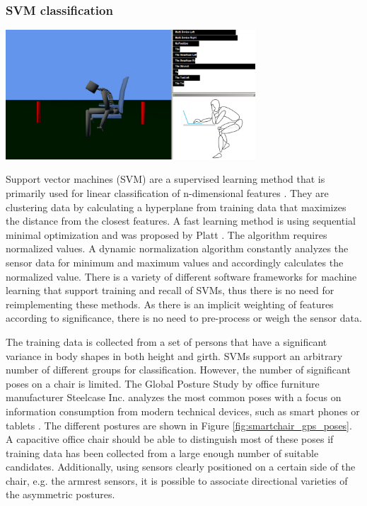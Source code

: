 \subsubsection*{SVM classification}
\begin{minipage}{\linewidth}
\centering
\includegraphics[width=0.7\textwidth]{images/smartchair_software}
\label{fig:smartchair_gps_poses}
\end{minipage}

Support vector machines (SVM) are a supervised learning method that is primarily used for linear classification of n-dimensional features \cite{hearst1998support}. They are clustering data by calculating a hyperplane from training data that maximizes the distance from the closest features. A fast learning method is using sequential minimal optimization and was proposed by Platt \cite{platt1999fast}. The algorithm requires normalized values. A dynamic normalization algorithm constantly analyzes the sensor data for minimum and maximum values and accordingly calculates the normalized value. There is a variety of different software frameworks for machine learning that support training and recall of SVMs, thus there is no need for reimplementing these methods. As there is an implicit weighting of features according to significance, there is no need to pre-process or weigh the sensor data.

The training data is collected from a set of persons that have a significant variance in body shapes in both height and girth. SVMs support an arbitrary number of different groups for classification. However, the number of significant poses on a chair is limited. The Global Posture Study by office furniture manufacturer Steelcase Inc. analyzes the most common poses with a focus on information consumption from modern technical devices, such as smart phones or tablets \cite{globalPosture}. The different postures are shown in Figure \ref{fig:smartchair_gps_poses}. A capacitive office chair should be able to distinguish most of these poses if training data has been collected from a large enough number of suitable candidates. Additionally, using sensors clearly positioned on a certain side of the chair, e.g. the armrest sensors, it is possible to associate directional varieties of the asymmetric postures.